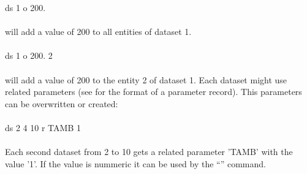 \documentclass{article}
\begin{document}
ds 1 o 200.\\\\
will add a value of 200 to all entities of dataset 1.\\\\
ds 1 o 200. 2\\\\
will add a value of 200 to the entity 2 of dataset 1.
Each dataset might use related parameters (see  for the format of a parameter record). This parameters can be overwritten or created:\\\\
ds 2 4 10 r TAMB 1\\\\
Each second dataset from 2 to 10 gets a related parameter 'TAMB' with the value '1'. If the value is nummeric it can be used by the ``'' command. 
\end{document}
